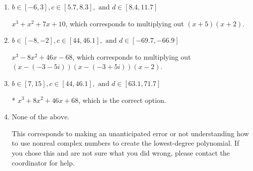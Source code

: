 \documentclass{extbook}[14pt]
\begin{document}
\begin{enumerate}
{\begin{enumerate}[label=\Alph*.]
$x^{3} + x^{2} +5 x + 6$, which corresponds to multiplying out $(x + 3)(x + 2)$.
\item \( b \in [-6, 3], c \in [5.7, 8.3], \text{ and } d \in [8.4, 11.7] \)

$x^{3} + x^{2} +7 x + 10$, which corresponds to multiplying out $(x + 5)(x + 2)$.
\item \( b \in [-8, -2], c \in [44, 46.1], \text{ and } d \in [-69.7, -66.9] \)

$x^{3} -8 x^{2} +46 x -68$, which corresponds to multiplying out $(x-(-3 - 5 i))(x-(-3 + 5 i))(x -2)$.
\item \( b \in [7, 15], c \in [44, 46.1], \text{ and } d \in [63.1, 71.7] \)

* $x^{3} +8 x^{2} +46 x + 68$, which is the correct option.
\item \( \text{None of the above.} \)

This corresponds to making an unanticipated error or not understanding how to use nonreal complex numbers to create the lowest-degree polynomial. If you chose this and are not sure what you did wrong, please contact the coordinator for help.
\end{enumerate}

}
\end{enumerate}
\end{document}
